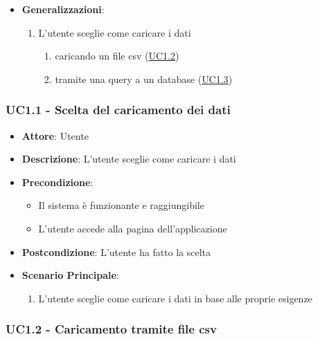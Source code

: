 \begin{itemize}
    \item \textbf{Generalizzazioni}:
        \begin{enumerate}
            \item L'utente sceglie come caricare i dati
                \begin{enumerate}
                    \item caricando un file csv (\hyperref[uc1.2]{UC1.2})
                    \item tramite una query a un database (\hyperref[uc1.3]{UC1.3})
                \end{enumerate}
        \end{enumerate}  
    \end{itemize}
    
    \subsubsection{UC1.1 - Scelta del caricamento dei dati}
    \label{uc1.1}
    
    \begin{itemize}
    \item \textbf{Attore}: Utente
    \item \textbf{Descrizione}: L'utente sceglie come caricare i dati
    \item \textbf{Precondizione}:
    \begin{itemize}
        \item Il sistema è funzionante e raggiungibile
        \item L'utente accede alla pagina dell'applicazione
    \end{itemize}
    \item \textbf{Postcondizione}: L'utente ha fatto la scelta
    \item \textbf{Scenario Principale}: 
        \begin{enumerate}
            \item L'utente sceglie come caricare i dati in base alle proprie esigenze
        \end{enumerate}
    \end{itemize}
    
    \subsubsection{UC1.2 - Caricamento tramite file csv}
    \label{uc1.2}
    
